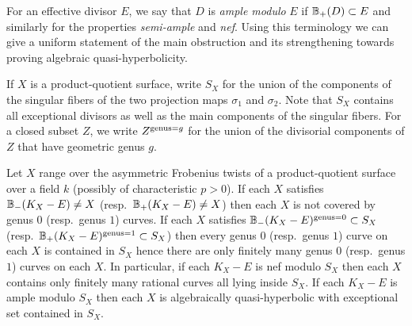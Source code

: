 \documentclass[main.tex]{subfiles}
\begin{document}
For an effective divisor $E$, we say that $D$ is \textit{ample modulo} $E$ if $\mathbb{B}_{+}(D) \subset E$ and similarly for the properties \textit{semi-ample} and \textit{nef}. Using this terminology we can give a uniform statement of the main obstruction and its strengthening towards proving algebraic quasi-hyperbolicity.

If $X$ is a product-quotient surface, write $S_X$ for the union of the components of the singular fibers of the two projection maps $\sigma_1$ and $\sigma_2$. Note that $S_X$ contains all exceptional divisors as well as the main components of the singular fibers. For a closed subset $Z$, we write $Z^{\mathrm{genus} = g}$ for the union of the divisorial components of $Z$ that have geometric genus $g$. 

\begin{theorem}
Let $X$ range over the asymmetric Frobenius twists of a product-quotient surface over a field $k$ (possibly of characteristic $p > 0$).  If each $X$ satisfies $\mathbb{B}_{-}(K_X - E) \neq X$ (resp.\ $\mathbb{B}_{+}(K_X - E) \neq X$) then each $X$ is not covered by genus $0$ (resp.\ genus $1$) curves. If each $X$ satisfies $\mathbb{B}_{-}(K_X - E)^{\mathrm{genus} = 0} \subset S_X$ (resp.\ $\mathbb{B}_{+}(K_X - E)^{\mathrm{genus} = 1} \subset S_X$) then every genus $0$ (resp.\ genus $1$) curve on each $X$ is contained in $S_X$ hence there are only finitely many genus $0$ (resp.\ genus $1$) curves on each $X$. In particular, if each $K_X - E$ is nef modulo $S_X$ then each $X$ contains only finitely many rational curves all lying inside $S_X$. If each $K_X - E$ is ample modulo $S_X$ then each $X$ is algebraically quasi-hyperbolic with exceptional set contained in $S_X$. 
\end{theorem}
\end{document}
